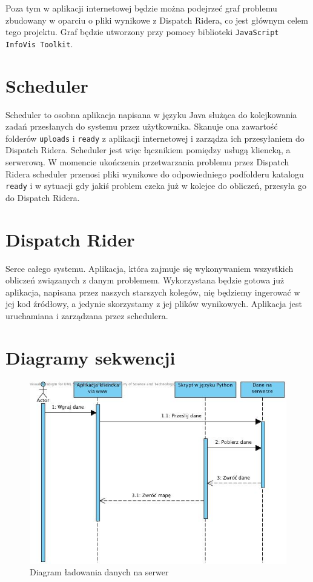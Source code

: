 Poza tym w aplikacji internetowej będzie można podejrzeć graf problemu zbudowany w oparciu o pliki
wynikowe z Dispatch Ridera, co jest głównym celem tego projektu. Graf będzie utworzony przy pomocy
biblioteki \texttt{JavaScript InfoVis Toolkit}.

\section{Scheduler}
Scheduler to osobna aplikacja napisana w języku Java służąca do kolejkowania zadań przesłanych do systemu
przez użytkownika. Skanuje ona zawartość folderów \texttt{uploads} i \texttt{ready} z aplikacji internetowej
i zarządza ich przesyłaniem do Dispatch Ridera. Scheduler jest więc łącznikiem pomiędzy usługą kliencką,
a serwerową. W momencie ukończenia przetwarzania problemu przez Dispatch Ridera scheduler przenosi pliki
wynikowe do odpowiedniego podfolderu katalogu \texttt{ready} i w sytuacji gdy jakiś problem czeka już w kolejce
do obliczeń, przesyła go do Dispatch Ridera.

\section{Dispatch Rider}
Serce całego systemu. Aplikacja, która zajmuje się wykonywaniem wszystkich obliczeń związanych z danym problemem.
Wykorzystana będzie gotowa już aplikacja, napisana przez naszych starszych kolegów, nię będziemy
ingerować w jej kod źródłowy, a jedynie skorzystamy z jej plików wynikowych. Aplikacja jest uruchamiana i zarządzana przez schedulera.

\section{Diagramy sekwencji}

\begin{center}
\begin{figure}[H]
\centering
\includegraphics[scale=0.8]{imgs/S2.jpg}
\caption{Diagram ładowania danych na serwer}
\label{fig:tasks_list}
\end{figure}
\end{center}

